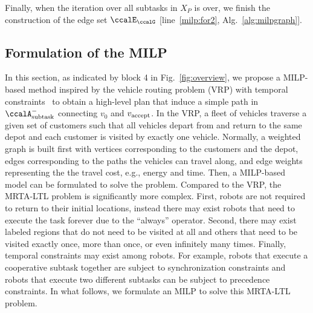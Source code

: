 \documentclass[Afour,sageh,times]{sagej}
\newcommand{\auto}[1]{\ccalA_{\textup{#1}}}
\newcommand{\vertex}[1]{v_{\textup{#1}}}
\begin{document}



Finally,  when the iteration over all subtasks in $X_{P}$ is over, we finish the construction of  the edge set $\ccalE_\ccalG$ [line~\ref{milp:for2},  Alg.~\ref{alg:milpgraph}].


 \subsection{Formulation of the MILP}\label{sec:milp}
 In this section, as indicated by block 4 in Fig.~\ref{fig:overview}, we propose a MILP-based method inspired by the vehicle routing problem (VRP) with temporal constraints~\cite{bredstrom2008combined} to obtain a high-level plan that induce a simple path in $\auto{subtask}^-$ connecting $v_0$ and $\vertex{accept}$. In the VRP, a fleet of vehicles traverse a given set of customers such that all vehicles depart from and return to the same depot and each customer is visited by exactly one vehicle. Normally, a weighted graph is built first with vertices corresponding to the customers and the depot, edges corresponding to the paths the vehicles can travel along, and edge weights representing the the travel cost, e.g., energy and time. Then,  a MILP-based model can be formulated to solve the problem. Compared to the VRP, the MRTA-LTL problem is significantly more complex. First, robots are not required  to return to their initial locations, instead there may exist robots that need to execute the task forever due to the  ``always'' operator. Second, there may exist  labeled regions that do not need to be  visited at all and others that need to be visited exactly once,  more than once, or even infinitely  many times. Finally, temporal constraints may exist  among robots. For example, robots that execute a cooperative subtask together are subject to synchronization constraints and robots that execute two different subtasks can be subject to precedence constraints. In what follows, we formulate an MILP to solve this MRTA-LTL problem.
\end{document}
